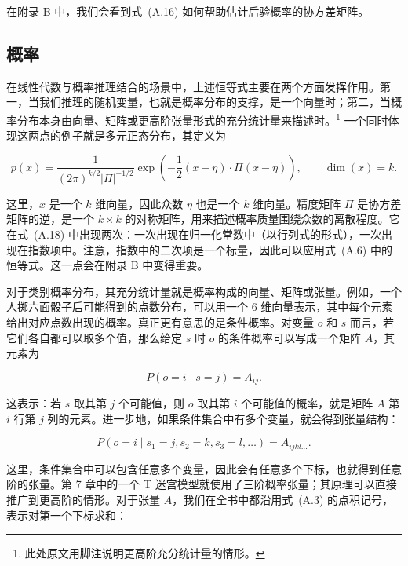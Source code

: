 在附录 B 中，我们会看到式~(A.16) 如何帮助估计后验概率的协方差矩阵。

\subsection{概率}

在线性代数与概率推理结合的场景中，上述恒等式主要在两个方面发挥作用。第一，当我们推理的随机变量，也就是概率分布的支撑，是一个向量时；第二，当概率分布本身由向量、矩阵或更高阶张量形式的充分统计量来描述时。\footnote{此处原文用脚注说明更高阶充分统计量的情形。} 一个同时体现这两点的例子就是多元正态分布，其定义为

\begin{equation}
p(x) =
\frac{1}{(2\pi)^{k/2} |\Pi|^{-1/2}}
\exp\!\left(
-\frac{1}{2} (x-\eta) \cdot \Pi (x-\eta)
\right),
\qquad
\dim(x)=k.
\tag{A.18}
\end{equation}

这里，$x$ 是一个 $k$ 维向量，因此众数 $\eta$ 也是一个 $k$ 维向量。精度矩阵 $\Pi$ 是协方差矩阵的逆，是一个 $k \times k$ 的对称矩阵，用来描述概率质量围绕众数的离散程度。它在式~(A.18) 中出现两次：一次出现在归一化常数中（以行列式的形式），一次出现在指数项中。注意，指数中的二次项是一个标量，因此可以应用式~(A.6) 中的恒等式。这一点会在附录 B 中变得重要。

对于类别概率分布，其充分统计量就是概率构成的向量、矩阵或张量。例如，一个人掷六面骰子后可能得到的点数分布，可以用一个 $6$ 维向量表示，其中每个元素给出对应点数出现的概率。真正更有意思的是条件概率。对变量 $o$ 和 $s$ 而言，若它们各自都可以取多个值，那么给定 $s$ 时 $o$ 的条件概率可以写成一个矩阵 $A$，其元素为

\begin{equation}
P(o=i \mid s=j) = A_{ij}.
\tag{A.19}
\end{equation}

这表示：若 $s$ 取其第 $j$ 个可能值，则 $o$ 取其第 $i$ 个可能值的概率，就是矩阵 $A$ 第 $i$ 行第 $j$ 列的元素。进一步地，如果条件集合中有多个变量，就会得到张量结构：

\begin{equation}
P(o=i \mid s_1=j, s_2=k, s_3=l, \ldots) = A_{ijkl\ldots}.
\tag{A.20}
\end{equation}

这里，条件集合中可以包含任意多个变量，因此会有任意多个下标，也就得到任意阶的张量。第 7 章中的一个 T 迷宫模型就使用了三阶概率张量；其原理可以直接推广到更高阶的情形。对于张量 $A$，我们在全书中都沿用式~(A.3) 的点积记号，表示对第一个下标求和：

